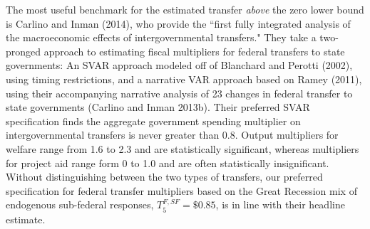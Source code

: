 \documentclass[12pt,letterpaper]{article}
\begin{document}
The most useful benchmark for the estimated transfer \textit{above} the zero lower bound is Carlino and Inman (2014), who provide the ``first fully integrated analysis of the macroeconomic effects of intergovernmental transfers." They take a two-pronged approach to estimating fiscal multipliers for federal transfers to state governments: An SVAR approach modeled off of Blanchard and Perotti (2002), using timing restrictions, and a narrative VAR approach based on Ramey (2011), using their accompanying narrative analysis of 23 changes in federal transfer to state governments (Carlino and Inman 2013b). Their preferred SVAR specification finds the aggregate government spending multiplier on intergovernmental transfers is never greater than 0.8. Output multipliers for welfare range from 1.6 to 2.3 and are statistically significant, whereas multipliers for project aid range form 0 to 1.0 and are often statistically insignificant. Without distinguishing between the two types of transfers, our preferred specification for federal transfer multipliers based on the Great Recession mix of endogenous sub-federal responses, $T^{F,SF}_5 = \$0.85$, is in line with their headline estimate.

%
\end{document}
